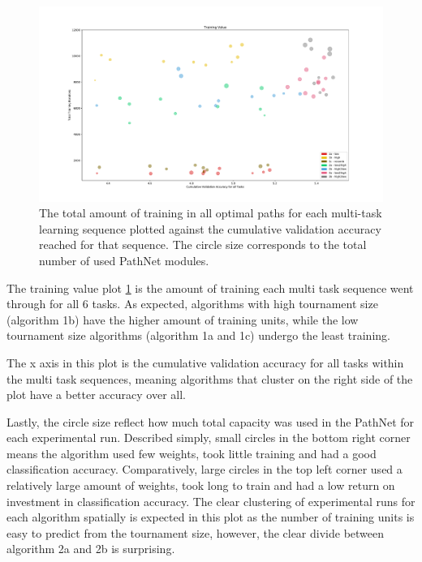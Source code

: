 \begin{figure}[p!]%
    \includegraphics[width=1.2\textwidth,center]{Chapters/Experiments/search_algo/figures/Training_value.pdf}
    \caption{The total amount of training in all optimal paths for each multi-task learning sequence plotted against the cumulative validation accuracy reached for that sequence. The circle size corresponds to the total number of used PathNet modules.}
    \label{fig:search.training_value}
\end{figure}

The training value plot \ref{fig:search.training_value} is the amount of training each multi task sequence went through for all 6 tasks. As expected, algorithms with high tournament size (algorithm 1b) have the higher amount of training units, while the low tournament size algorithms (algorithm 1a and 1c) undergo the least training.

The x axis in this plot is the cumulative validation accuracy for all tasks within the multi task sequences, meaning algorithms that cluster on the right side of the plot have a better accuracy over all. 

Lastly, the circle size reflect how much total capacity was used in the PathNet for each experimental run. Described simply, small circles in the bottom right corner means the algorithm used few weights, took little training and had a good classification accuracy. Comparatively, large circles in the top left corner used a relatively large amount of weights, took long to train and had a low return on investment in classification accuracy. The clear clustering of experimental runs for each algorithm spatially is expected in this plot as the number of training units is easy to predict from the tournament size, however, the clear divide between algorithm 2a and 2b is surprising.

